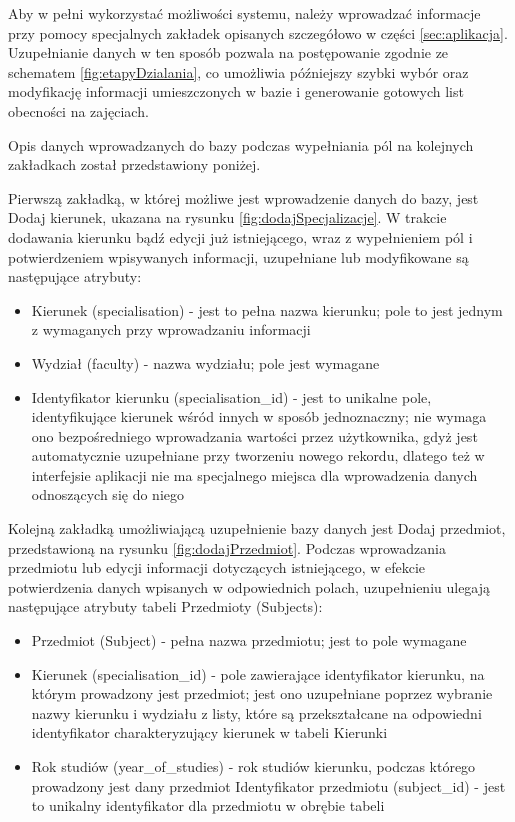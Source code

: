 Aby w pełni wykorzystać możliwości systemu, należy wprowadzać informacje przy pomocy specjalnych zakładek opisanych szczegółowo w części \ref{sec:aplikacja}. Uzupełnianie danych w ten sposób pozwala na postępowanie zgodnie ze schematem \ref{fig:etapyDzialania}, co umożliwia późniejszy szybki wybór oraz modyfikację informacji umieszczonych w bazie i generowanie gotowych list obecności na zajęciach.

Opis danych wprowadzanych do bazy podczas wypełniania pól na kolejnych zakładkach został przedstawiony poniżej.

Pierwszą zakładką, w której możliwe jest wprowadzenie danych do bazy, jest Dodaj kierunek, ukazana na rysunku \ref{fig:dodajSpecjalizacje}. W trakcie dodawania kierunku bądź edycji już istniejącego, wraz z wypełnieniem pól i potwierdzeniem wpisywanych informacji, uzupełniane lub modyfikowane są następujące atrybuty:

\begin{itemize}

\item Kierunek (specialisation) - jest to pełna nazwa kierunku; pole to jest jednym z wymaganych przy wprowadzaniu informacji 
\item Wydział (faculty) - nazwa wydziału; pole jest wymagane
\item Identyfikator kierunku (specialisation\_id) - jest to unikalne pole, identyfikujące kierunek wśród innych w sposób jednoznaczny; nie wymaga ono bezpośredniego wprowadzania wartości przez użytkownika, gdyż jest automatycznie uzupełniane przy tworzeniu nowego rekordu, dlatego też w interfejsie aplikacji nie ma specjalnego miejsca dla wprowadzenia danych odnoszących się do niego
\end{itemize}
Kolejną zakładką umożliwiającą uzupełnienie bazy danych jest Dodaj przedmiot, przedstawioną na rysunku \ref{fig:dodajPrzedmiot}. Podczas wprowadzania przedmiotu lub edycji informacji dotyczących istniejącego, w efekcie potwierdzenia danych wpisanych w odpowiednich polach, uzupełnieniu ulegają następujące atrybuty tabeli Przedmioty (Subjects):
\begin{itemize}
\item Przedmiot (Subject) - pełna nazwa przedmiotu; jest to pole wymagane
\item Kierunek (specialisation\_id) - pole zawierające identyfikator kierunku, na którym prowadzony jest przedmiot; jest ono uzupełniane poprzez wybranie nazwy kierunku i wydziału z listy, które są przekształcane na odpowiedni identyfikator charakteryzujący kierunek w tabeli Kierunki
\item Rok studiów (year\_of\_studies) - rok studiów kierunku, podczas którego prowadzony jest dany przedmiot
Identyfikator przedmiotu (subject\_id) - jest to unikalny identyfikator dla przedmiotu w obrębie tabeli
\end{itemize}

